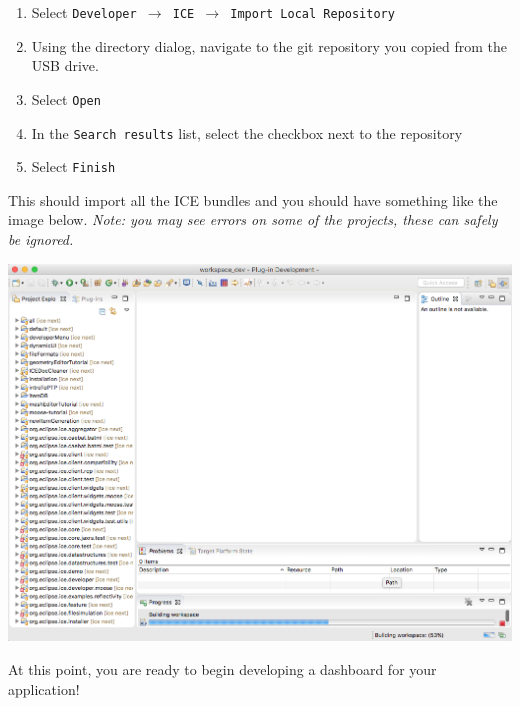 \begin{enumerate}
\item Select \texttt{Developer $\rightarrow$ ICE $\rightarrow$
Import Local Repository}
\item Using the directory dialog, navigate to the git repository you copied
from the USB drive.
\item Select \texttt{Open}
\item In the \texttt{Search results} list, select the checkbox next to the
repository
\item Select \texttt{Finish}
\end{enumerate}

This should import all the ICE bundles and you should have something
like the image below. \textit{Note: you may see errors on some of the projects,
these can safely be ignored.}
\begin{center} \includegraphics[width=\textwidth]{figures/cloned} \end{center}

At this point, you are ready to begin developing a dashboard for your
application!
